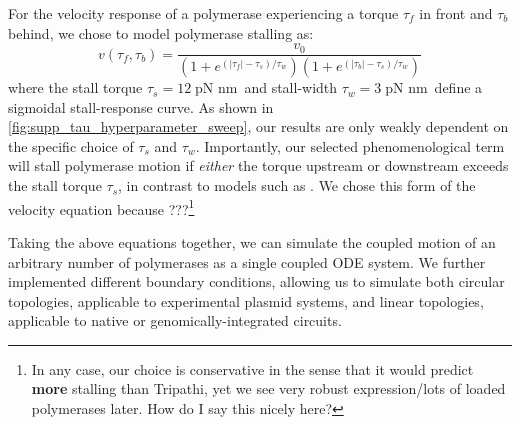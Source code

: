 \documentclass[11pt]{article}
\newcommand{\unit}[1]{\; \text{#1}\,}
\begin{document}
For the velocity response of a polymerase experiencing a torque \(\tau_f\) in front and \(\tau_b\) behind, we chose to model polymerase stalling as:
\begin{equation}
    v(\tau_f, \tau_b) = \frac{v_0}{(1 + e^{(|\tau_f| - \tau_s)/\tau_w})(1 + e^{(|\tau_b| - \tau_s)/\tau_w})}
\label{eq:velocity_response}
\end{equation}
where the stall torque \(\tau_s = 12 \unit{pN nm}\) and stall-width \(\tau_w = 3 \unit{pN nm}\) define a sigmoidal stall-response curve.
As shown in \cref{fig:supp_tau_hyperparameter_sweep}, our results are only weakly dependent on the specific choice of \(\tau_s\) and \(\tau_w\).
Importantly, our selected phenomenological term will stall polymerase motion if \emph{either} the torque upstream or downstream exceeds the stall torque \(\tau_s\), in contrast to models such as \textcite{tripathiDNASupercoilingmediatedCollective2021}. We chose this form of the velocity equation because ???\footnote{In any case, our choice is conservative in the sense that it would predict \textbf{more} stalling than Tripathi, yet we see very robust expression/lots of loaded polymerases later. How do I say this nicely here?}


Taking the above equations together, we can simulate the coupled motion of an arbitrary number of polymerases as a single coupled ODE system. We further implemented different boundary conditions, allowing us to simulate both circular topologies, applicable to experimental plasmid systems, and linear topologies, applicable to native or genomically-integrated circuits.
\end{document}
